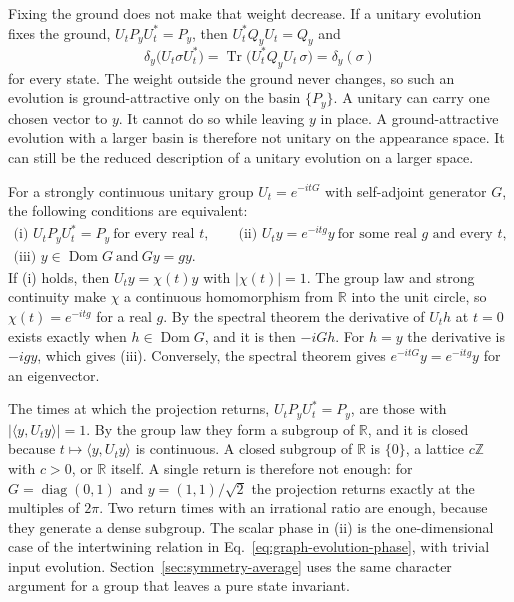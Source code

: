 \documentclass[11pt]{article}
\theoremstyle{definition}
\DeclareMathOperator{\Tr}{Tr}
\newcommand{\R}{\mathbb R}
\begin{document}
Fixing the ground does not make that weight decrease. If a unitary evolution fixes the ground, $U_tP_yU_t^*=P_y$, then $U_t^*Q_yU_t=Q_y$ and
\begin{equation}
 \delta_y\bigl(U_t\sigma U_t^*\bigr)=\Tr\bigl(U_t^*Q_yU_t\,\sigma\bigr)=\delta_y(\sigma)
 \label{eq:relaxation-unitary}
\end{equation}
for every state. The weight outside the ground never changes, so such an evolution is ground-attractive only on the basin $\{P_y\}$. A unitary can carry one chosen vector to $y$. It cannot do so while leaving $y$ in place. A ground-attractive evolution with a larger basin is therefore not unitary on the appearance space. It can still be the reduced description of a unitary evolution on a larger space.

For a strongly continuous unitary group $U_t=e^{-itG}$ with self-adjoint generator $G$, the following conditions are equivalent:
\begin{equation}
 \begin{gathered}
 \text{(i) }U_tP_yU_t^*=P_y\ \text{for every real }t,\qquad
 \text{(ii) }U_ty=e^{-itg}y\ \text{for some real }g\text{ and every }t,\\
 \text{(iii) }y\in\operatorname{Dom}G\ \text{and}\ Gy=gy .
 \end{gathered}
 \label{eq:relaxation-unitary-group}
\end{equation}
If (i) holds, then $U_ty=\chi(t)y$ with $|\chi(t)|=1$. The group law and strong continuity make $\chi$ a continuous homomorphism from $\R$ into the unit circle, so $\chi(t)=e^{-itg}$ for a real $g$. By the spectral theorem the derivative of $U_th$ at $t=0$ exists exactly when $h\in\operatorname{Dom}G$, and it is then $-iGh$. For $h=y$ the derivative is $-igy$, which gives (iii). Conversely, the spectral theorem gives $e^{-itG}y=e^{-itg}y$ for an eigenvector.

The times at which the projection returns, $U_tP_yU_t^*=P_y$, are those with $|\langle y,U_ty\rangle|=1$. By the group law they form a subgroup of $\R$, and it is closed because $t\mapsto\langle y,U_ty\rangle$ is continuous. A closed subgroup of $\R$ is $\{0\}$, a lattice $c\mathbb Z$ with $c>0$, or $\R$ itself. A single return is therefore not enough: for $G=\operatorname{diag}(0,1)$ and $y=(1,1)/\sqrt2$ the projection returns exactly at the multiples of $2\pi$. Two return times with an irrational ratio are enough, because they generate a dense subgroup. The scalar phase in (ii) is the one-dimensional case of the intertwining relation in Eq.~\eqref{eq:graph-evolution-phase}, with trivial input evolution. Section~\ref{sec:symmetry-average} uses the same character argument for a group that leaves a pure state invariant.
\end{document}
